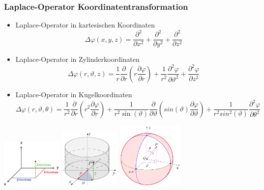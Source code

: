 \subsubsection{Laplace-Operator Koordinatentransformation }
\begin{minipage}{15cm}
\begin{itemize}
	\item Laplace-Operator in kartesischen Koordinaten
	\[\Delta \varphi(x,y,z) = \frac{\partial^{2}}{\partial x^{2}}+\frac{\partial^{2}}{\partial y^{2}}+\frac{\partial^{2}}{\partial z^{2}}\]\vspace{0.5cm}
	\item Laplace-Operator in Zylinderkoordinaten
	\[\Delta \varphi(r,\vartheta,z) = \frac{1}{r} \dfrac{\partial}{\partial r} \left(r \frac{\partial \varphi}{\partial r}\right) + \frac{1}{r^2}\frac{\partial^2 \varphi}{\partial \vartheta^2}+\dfrac{\partial^2 \varphi}{\partial z^2} \]
    \vspace{0.5cm}
	\item Laplace-Operator in Kugelkoordinaten
	\[\Delta \varphi(r,\vartheta,\theta) = \frac{1}{r^2} \dfrac{\partial}{\partial r} \left( r^2 \frac{\partial \varphi}{\partial r}\right) + \frac{1}{r^2 \sin(\vartheta)}\frac{\partial}{\partial \vartheta}\left(sin(\vartheta)\dfrac{\partial \varphi}{\partial \vartheta} \right) +\frac{1}{r^2 sin^2(\vartheta)}\dfrac{\partial^2 \varphi}{\partial \theta^2}\]
\end{itemize}
\end{minipage}
\begin{minipage}{4cm}
\includegraphics[width=3cm]{images/KartKoord.png}\newline
\includegraphics[width=3cm]{images/Cylindrical_Coordinates.png}\newline
\includegraphics[width=3.3cm]{images/Kugelkoord.png}
\end{minipage}
